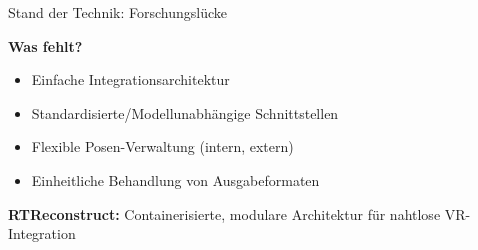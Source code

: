     
    
    

\begin{frame}{Stand der Technik: Forschungslücke}
    \vspace{0.3cm}
    \begin{center}
        \Large \textbf{Was fehlt?}
    \end{center}
    
    \vspace{0.4cm}
    \begin{itemize}
        \item Einfache Integrationsarchitektur
        \item Standardisierte/Modellunabhängige Schnittstellen
        \item Flexible Posen-Verwaltung (intern, extern)
        \item Einheitliche Behandlung von Ausgabeformaten
    \end{itemize}
    
    \vspace{0.6cm}
    \begin{tcolorbox}[box5, title={\textbf{Lösung}}]
        \centering
        \textbf{RTReconstruct:} Containerisierte, modulare Architektur für nahtlose VR-Integration
    \end{tcolorbox}
\end{frame}

